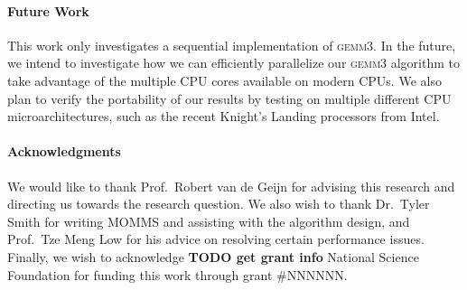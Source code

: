 \documentclass[12pt]{article}
\newcommand*{\gemmt}{{\textsc{gemm3}}}
\begin{document}
\paragraph{Future Work} This work only investigates a sequential implementation of \gemmt{}.
In the future, we intend to investigate how we can efficiently parallelize our \gemmt{} algorithm to take advantage of the multiple CPU cores available on modern CPUs.
We also plan to verify the portability of our results by testing on multiple different CPU microarchitectures, such as the recent Knight's Landing processors from Intel.

\paragraph{Acknowledgments}
We would like to thank Prof.\ Robert van de Geijn for advising this research and directing us towards the research question.
We also wish to thank Dr.\ Tyler Smith for writing MOMMS and assisting with the algorithm design, and Prof.\ Tze Meng Low for his advice on resolving certain performance issues.
Finally, we wish to acknowledge \textbf{TODO get grant info} National Science Foundation for funding this work through grant \#NNNNNN.
\printbibliography{}
\end{document}
